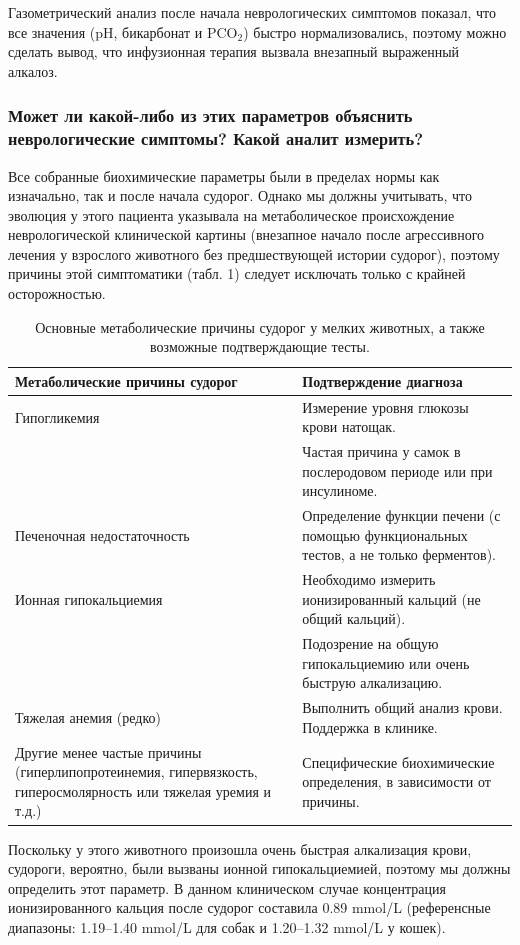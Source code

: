 \documentclass[a4paper,12pt]{book}
\begin{document}
Газометрический анализ после начала неврологических симптомов показал, что все значения (pH, бикарбонат и $\mathrm{PCO_2}$) быстро нормализовались, поэтому можно сделать вывод, что инфузионная терапия вызвала внезапный выраженный алкалоз.

\subsubsection*{Может ли какой-либо из этих параметров объяснить неврологические симптомы? Какой аналит измерить?}
Все собранные биохимические параметры были в пределах нормы как изначально, так и после начала судорог. Однако мы должны учитывать, что эволюция у этого пациента указывала на метаболическое происхождение неврологической клинической картины (внезапное начало после агрессивного лечения у взрослого животного без предшествующей истории судорог), поэтому причины этой симптоматики (табл. 1) следует исключать только с крайней осторожностью.

\begin{table}[htbp]
\centering
\caption{Основные метаболические причины судорог у мелких животных, а также возможные подтверждающие тесты.}
\begin{tabular}{p{6cm}p{8cm}}
\toprule
Метаболические причины судорог & Подтверждение диагноза \\
\midrule
Гипогликемия & Измерение уровня глюкозы крови натощак. \\
& Частая причина у самок в послеродовом периоде или при инсулиноме. \\
Печеночная недостаточность & Определение функции печени (с помощью функциональных тестов, а не только ферментов). \\
Ионная гипокальциемия & Необходимо измерить ионизированный кальций (не общий кальций). \\
& Подозрение на общую гипокальциемию или очень быструю алкализацию. \\
Тяжелая анемия (редко) & Выполнить общий анализ крови. Поддержка в клинике. \\
Другие менее частые причины (гиперлипопротеинемия, гипервязкость, гиперосмолярность или тяжелая уремия и т.д.) & Специфические биохимические определения, в зависимости от причины. \\
\bottomrule
\end{tabular}
\end{table}

Поскольку у этого животного произошла очень быстрая алкализация крови, судороги, вероятно, были вызваны ионной гипокальциемией, поэтому мы должны определить этот параметр. В данном клиническом случае концентрация ионизированного кальция после судорог составила 0.89 mmol/L (референсные диапазоны: 1.19--1.40 mmol/L для собак и 1.20--1.32 mmol/L у кошек).
\end{document}
